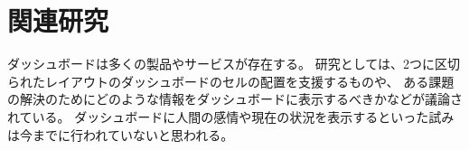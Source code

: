 \section{関連研究}

ダッシュボードは多くの製品やサービスが存在する。
研究としては、2つに区切られたレイアウトのダッシュボードのセルの配置を支援するもの\cite{Hertzog:2015:BSP:2678025.2701383}や、
ある課題の解決のためにどのような情報をダッシュボードに表示するべきか\cite{Jones:2015:ECI:2800835.2800963}などが議論されている。
ダッシュボードに人間の感情や現在の状況を表示するといった試みは今までに行われていないと思われる。